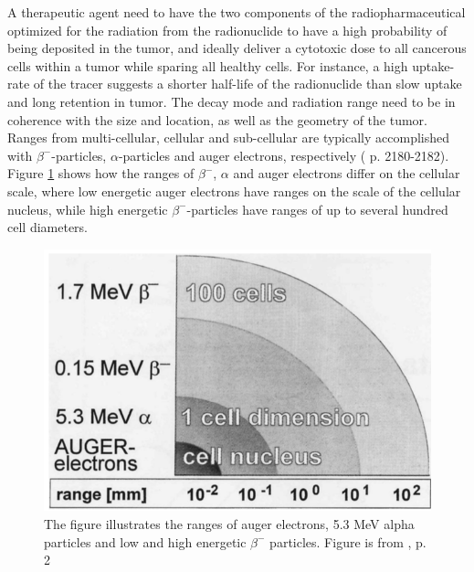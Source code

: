 A therapeutic agent need to have the two components of the radiopharmaceutical optimized for the radiation from the radionuclide to have a high probability of being deposited in the tumor, and ideally deliver a cytotoxic dose to all cancerous cells within a tumor while sparing all healthy cells. For instance, a high uptake-rate of the tracer suggests a shorter half-life of the radionuclide than slow uptake and long retention in tumor. The decay mode and radiation range need to be in coherence with the size and location, as well as the geometry of the tumor. Ranges from multi-cellular, cellular and sub-cellular are typically accomplished with $\beta^-$-particles, $\alpha$-particles and auger electrons, respectively (\cite{Vertes2011a} p. 2180-2182). Figure \ref{fig:cell_dimension} shows how the ranges of $\beta^-$, $\alpha$ and auger electrons differ on the cellular scale, where low energetic auger electrons have ranges on the scale of the cellular nucleus, while high energetic $\beta^-$-particles have ranges of up to several hundred cell diameters. \\ %


\begin{figure}
    \centering
    \includegraphics{Theory/cell_dimension.png}
    \caption{The figure illustrates the ranges of auger electrons, 5.3 MeV alpha particles and low and high energetic $\beta^-$ particles. Figure is from \cite{international2012iaea}, p. 2}
    \label{fig:cell_dimension}
\end{figure}


